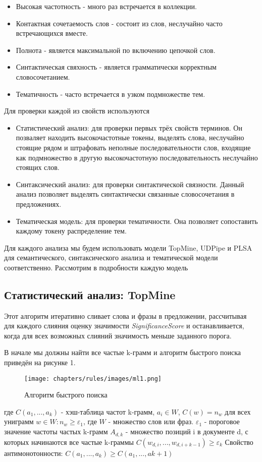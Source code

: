\begin{itemize}
	\item Высокая частотность - много раз встречается в коллекции.
	\item Контактная сочетаемость слов - состоит из слов, неслучайно часто встречающихся вместе.
	\item Полнота - является максимальной по включению цепочкой слов.
	\item Синтактическая свяхность - является грамматически корректным словосочетанием.
	\item Тематичность - часто встречается в узком подмножестве тем.
\end{itemize}

Для проверки каждой из свойств используются 

\begin{itemize}
	\item Статистический анализ: для проверки первых трёх свойств терминов. Он позваляет находить высокочастотные токены, выделять слова, неслучайно стоящие рядом и штрафовать неполные последовательности слов, входящие как подмножество в другую высокочастотную последовательность неслучайно стоящих слов.
	\item Синтаксический анализ: для проверки синтактической связности. Данный анализ позволяет выделять синтактически связанные словосочетания в предложениях.
	\item Тематическая модель: для проверки тематичности. Она позволяет сопоставить каждому токену распределение тем.
\end{itemize}

Для каждого анализа мы будем использовать модели TopMine, UDPipe и PLSA для семантического, синтаксического анализа и тематической модели соответственно. Рассмотрим в подробности каждую модель

\subsection*{Статистический анализ: TopMine}

Этот алгоритм итеративно сливает слова и фразы в предложении, рассчитывая для каждого слияния оценку значимости \textit{SignificanceScore} и останавливается, когда для всех возможных слияний значимость меньше заданного порога. 

В начале мы должны найти все частые k-грамм и алгоритм быстрого поиска приведён на рисунке 1.
\begin{figure}
    \texttt{[image: chapters/rules/images/ml1.png]}
    \caption{Алгоритм быстрого поиска}
\end{figure}
где $C(a_{1},...,a_{k})$ - хэш-таблица частот k-грамм, $a_{i} \in W$, $C(w) = n_{w}$ для всех униграмм $w \in W: n_{w} \geq \varepsilon_{1}$, где $W$ - множество слов или фраз.
$\varepsilon_{1}$ - пороговое значение частоты частых k-грамм
$A_{d,k}$ - множество позиций i в документе d, с которых начинаются все частые k-граммы
$C(w_{d,i},...,w_{d,i+k-1}) \geq \varepsilon_{k}$
Свойство антимонотонности: $C(a_{1},...,a_{k}) \geq C(a_{1},...,a{k+1})$

